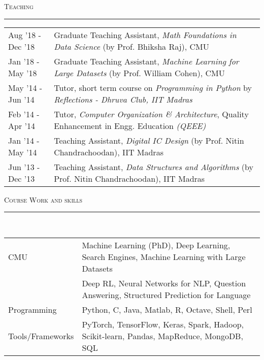 \documentclass[8pt,a4paper,English]{article}
\newcommand{\lv}{\color{table-border}\vrule}
\newcommand\roottitle[1]{ \vspace{3mm} \noindent \textsc{ \normalsize #1} \vspace{1.5mm} \nopagebreak[4] \color{gray} \hrule \color{black} \vspace{2mm} \noindent \small }
\begin{document}
{\roottitle{Teaching}
\renewcommand{\arraystretch}{1.2}
\setlength\tabcolsep{8pt}
\begin{tabularx}{\textwidth}{ R{2.6cm} !{\lv} X }
  Aug '18 - Dec '18 & Graduate Teaching Assistant, \textit{Math Foundations in Data Science} (by Prof. Bhiksha Raj), CMU \\
  Jan '18 - May '18 & Graduate Teaching Assistant, \textit{Machine Learning for Large Datasets} (by Prof. William Cohen), CMU\\
  May '14 - Jun '14 & Tutor, short term course on \textit{ Programming in Python} by \textit{Reflections - Dhruva Club, IIT Madras}\\
  Feb '14 - Apr '14 & Tutor, \textit{Computer Organization \& Architecture}, Quality Enhancement in Engg. Education \textit{(QEEE)} \\
  Jan '14 - May '14 & Teaching Assistant, \textit{Digital IC Design} (by Prof. Nitin Chandrachoodan), IIT Madras \\
  Jun '13 - Dec '13 & Teaching Assistant, \textit{Data Structures and Algorithms} (by Prof. Nitin Chandrachoodan), IIT Madras \\
\end{tabularx}


\roottitle{Course Work and skills} \\
\renewcommand{\arraystretch}{1.2}
\setlength\tabcolsep{8pt}
\begin{tabularx}{\textwidth}{ R{2.8cm} !{\lv} X }
	CMU                        & Machine Learning (PhD), Deep Learning, Search Engines, Machine Learning with Large Datasets \\
		& Deep RL, Neural Networks for NLP, Question Answering, Structured Prediction for Language \\
	Programming                & Python, C, Java, Matlab, R, Octave, Shell, Perl \\
	Tools/Frameworks           & PyTorch, TensorFlow, Keras, Spark, Hadoop, Scikit-learn, Pandas, MapReduce, MongoDB, SQL \\
\end{tabularx}

}
\end{document}
